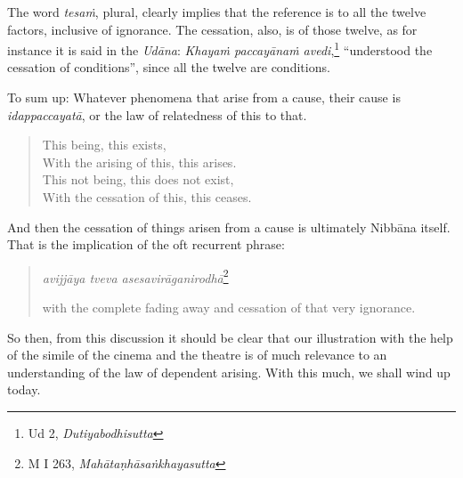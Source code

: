 The word \emph{tesaṁ}, plural, clearly implies that the reference is to all the twelve factors, inclusive of ignorance. The cessation, also, is of those twelve, as for instance it is said in the \emph{Udāna}: \emph{Khayaṁ paccayānaṁ avedi},\footnote{Ud 2, \emph{Dutiyabodhisutta}} ``understood the cessation of conditions'', since all the twelve are conditions.

To sum up: Whatever phenomena that arise from a cause, their cause is \emph{idappaccayatā}, or the law of relatedness of this to that.

\begin{quote}
This being, this exists,\\
With the arising of this, this arises.\\
This not being, this does not exist,\\
With the cessation of this, this ceases.
\end{quote}

And then the cessation of things arisen from a cause is ultimately Nibbāna itself. That is the implication of the oft recurrent phrase:

\begin{quote}
\emph{avijjāya tveva asesavirāganirodhā}\footnote{M I 263, \emph{Mahātaṇhāsaṅkhayasutta}}

with the complete fading away and cessation of that very ignorance.
\end{quote}

So then, from this discussion it should be clear that our illustration with the help of the simile of the cinema and the theatre is of much relevance to an understanding of the law of dependent arising. With this much, we shall wind up today.
